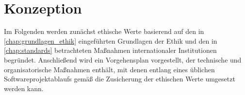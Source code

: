 \chapter{Konzeption}\label{chap:konzeption}
Im Folgenden werden  zunächst ethische Werte basierend auf den in \autoref{chap:grundlagen_ethik} eingeführten Grundlagen der Ethik und den in \autoref{chap:standards} betrachteten Maßnahmen internationaler Institutionen begründet.
Anschließend wird ein Vorgehensplan vorgestellt, der technische und organisatorische Maßnahmen enthält, mit denen entlang eines üblichen Softwareprojektablaufs gemäß \cite[S. 64]{broy2013} die Zusicherung der ethischen Werte umgesetzt werden kann.


